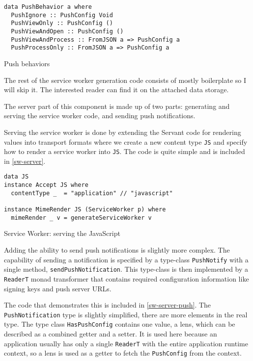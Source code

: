\documentclass[english,odsaz]{fitthesis}
\begin{document}
\begin{listing}[htbp]
\begin{verbatim}
data PushBehavior a where
  PushIgnore :: PushConfig Void
  PushViewOnly :: PushConfig ()
  PushViewAndOpen :: PushConfig ()
  PushViewAndProcess :: FromJSON a => PushConfig a
  PushProcessOnly :: FromJSON a => PushConfig a
\end{verbatim}
\caption{Push behaviors \label{push-behaviors}}
\end{listing}

The rest of the service worker generation code consists of mostly boilerplate so
I will skip it. The interested reader can find it on the attached data storage.

The server part of this component is made up of two parts: generating and
serving the service worker code, and sending push notifications.

Serving the service worker is done by extending the Servant code for rendering
values into transport formats where we create a new content type \texttt{JS} and specify
how to render a service worker into \texttt{JS}. The code is quite simple and is included in
\ref{sw-server}.

\begin{listing}[htbp]
\begin{verbatim}
data JS
instance Accept JS where
  contentType _  = "application" // "javascript"

instance MimeRender JS (ServiceWorker p) where
  mimeRender _ v = generateServiceWorker v
\end{verbatim}
\caption{Service Worker: serving the JavaScript \label{sw-server}}
\end{listing}

Adding the ability to send push notifications is slightly more complex. The
capability of sending a notification is specified by a type-class \texttt{PushNotify}
with a single method, \texttt{sendPushNotification}. This type-class is then implemented
by a \texttt{ReaderT} monad transformer that contains required configuration information
like signing keys and push server URLs.

The code that demonstrates this is included in \ref{sw-server-push}. The
\texttt{PushNotification} type is slightly simplified, there are more elements in the
real type. The type class \texttt{HasPushConfig} contains one value, a lens, which can be
described as a combined getter and a setter. It is used here because an
application usually has only a single \texttt{ReaderT} with the entire application
runtime context, so a lens is used as a getter to fetch the \texttt{PushConfig} from the
context.
\end{document}
